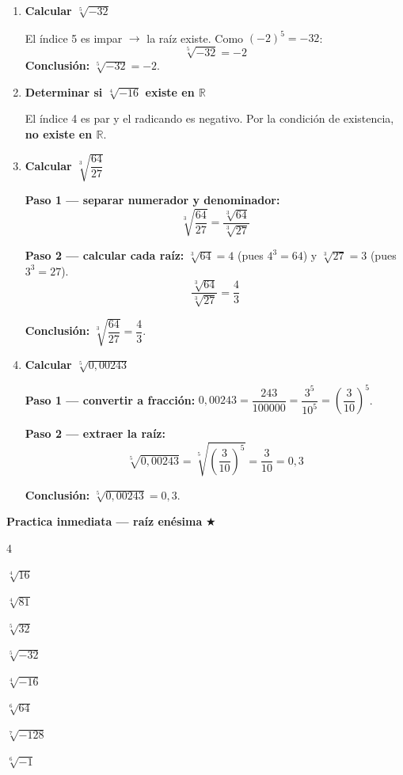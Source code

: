\documentclass[11pt, letterpaper]{article}
\begin{document}
\begin{tcolorbox}[examplebox, title={Ejemplos — raíz enésima y condiciones de existencia}]
\begin{enumerate}[label=\textbf{Ej. \arabic*.}, leftmargin=*, itemsep=14pt]

\item \textbf{Calcular $\sqrt[5]{-32}$}

El índice 5 es impar $\rightarrow$ la raíz existe. Como $(-2)^5 = -32$:
$$\sqrt[5]{-32} = -2$$
\textbf{Conclusión:} $\sqrt[5]{-32} = -2$.

\item \textbf{Determinar si $\sqrt[4]{-16}$ existe en $\mathbb{R}$}

El índice 4 es par y el radicando es negativo. Por la condición de existencia, \textbf{no existe en $\mathbb{R}$}.

\item \textbf{Calcular $\sqrt[3]{\dfrac{64}{27}}$}

\textbf{Paso 1 — separar numerador y denominador:}
$$\sqrt[3]{\frac{64}{27}} = \frac{\sqrt[3]{64}}{\sqrt[3]{27}}$$

\textbf{Paso 2 — calcular cada raíz:} $\sqrt[3]{64}=4$ (pues $4^3=64$) y $\sqrt[3]{27}=3$ (pues $3^3=27$).
$$\frac{\sqrt[3]{64}}{\sqrt[3]{27}} = \frac{4}{3}$$

\textbf{Conclusión:} $\sqrt[3]{\dfrac{64}{27}} = \dfrac{4}{3}$.

\item \textbf{Calcular $\sqrt[5]{0{,}00243}$}

\textbf{Paso 1 — convertir a fracción:} $0{,}00243 = \dfrac{243}{100000} = \dfrac{3^5}{10^5} = \left(\dfrac{3}{10}\right)^5$.

\textbf{Paso 2 — extraer la raíz:}
$$\sqrt[5]{0{,}00243} = \sqrt[5]{\left(\frac{3}{10}\right)^5} = \frac{3}{10} = 0{,}3$$

\textbf{Conclusión:} $\sqrt[5]{0{,}00243} = 0{,}3$.

\end{enumerate}
\end{tcolorbox}

\medskip
\textbf{Practica inmediata — raíz enésima} \quad $\bigstar$

\begin{enumerate}[label=\alph*), leftmargin=*, itemsep=2pt]
\begin{multicols}{4}
  \item $\sqrt[4]{16}$
  \item $\sqrt[4]{81}$
  \item $\sqrt[5]{32}$
  \item $\sqrt[5]{-32}$
  \item $\sqrt[4]{-16}$
  \item $\sqrt[6]{64}$
  \item $\sqrt[7]{-128}$
  \item $\sqrt[6]{-1}$
\end{multicols}
\end{enumerate}
\end{document}
